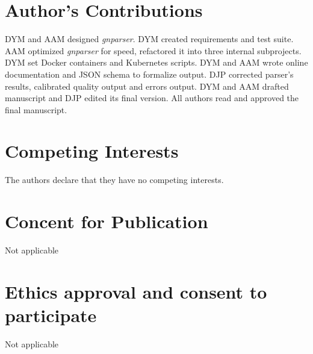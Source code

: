 \documentclass{bmcart}
\begin{document}
\section*{Author's Contributions}

DYM and AAM designed \textit{gnparser}. DYM created requirements and test suite. AAM optimized \textit{gnparser} for speed, refactored it into three internal subprojects. DYM set Docker containers and Kubernetes scripts. DYM and AAM wrote online documentation and JSON schema to formalize output. DJP corrected parser's results, calibrated quality output and errors output. DYM and AAM drafted manuscript and DJP edited its final version. All authors read and approved the final manuscript.

\section*{Competing Interests}

The authors declare that they have no competing interests.

\section*{Concent for Publication}

Not applicable

\section*{Ethics approval and consent to participate}

Not applicable

\end{document}

